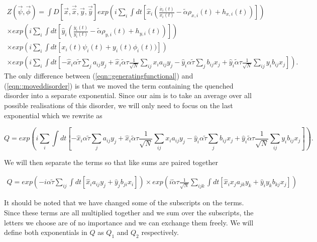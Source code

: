 \documentclass{article}
\begin{document}
	\begin{equation}
	\begin{split}
	\label{eqn::moveddisorder}
		Z(\Vec{\psi}, \Vec{\phi}) = \int D[\Vec{x}, \Vec{\hat{x}}, \Vec{y}, \Vec{\hat{y}}] exp(i
		\sum_i \int dt[\hat{x}_i
		(\frac{\dot{x_i}(t)}{x_i(t)}
			- \tilde{\alpha} \rho_{x, i}(t)+ h_{x, i}(t))]) 
			\\
			\times exp(i \sum_i \int dt[\hat{y}_i
		(\frac{\dot{y_i}(t)}{y_i(t)} 
			- \tilde{\alpha} \rho_{y, i}(t) + h_{y, i}(t))])\\
			\times exp(i \sum_i
		\int dt[x_i(t) \psi_i(t) + y_i(t) \phi_i(t))])\\
		\times exp(i \sum_i \int dt[- \hat{x}_i \alpha \tilde{\tau} \sum_{j} a_
			{ij} 
			y_j +
			\hat{x}_i \tilde{\alpha} \tau \frac{1}{\sqrt{N}} \sum_{i j} x_i a_{ij} y_j - \hat{y}_i
			\alpha 
			\tilde{\tau} \sum_{j} b_
			{ij} 
			x_j +
			\hat{y}_i \tilde{\alpha} \tau \frac{1}{\sqrt{N}} \sum_{i j} y_i b_{ij} x_j]).
	\end{split}
	\end{equation}
	The only difference between (\ref{eqn::generatingfunctional}) and (\ref{eqn::moveddisorder}) is
	that we moved the term containing the quenched disorder into a separate exponential. Since our
	aim is to take an average over all possible realisations of this disorder, we will only need to
	focus on the last exponential which we rewrite as

	\begin{equation}
		Q = exp(i \sum_i \int dt[- \hat{x}_i \alpha \tilde{\tau} \sum_{j} a_
			{ij} 
			y_j +
			\hat{x}_i \tilde{\alpha} \tau \frac{1}{\sqrt{N}} \sum_{i j} x_i a_{ij} y_j - \hat{y}_i
			\alpha 
			\tilde{\tau} \sum_{j} b_
			{ij} 
			x_j +
			\hat{y}_i \tilde{\alpha} \tau \frac{1}{\sqrt{N}} \sum_{i j} y_i b_{ij} x_j]).
	\end{equation}

	We will then separate the terms so that like sums are paired together

	\begin{equation}
	\begin{split}
		Q = exp(-i \alpha \tilde{\tau} \sum_{ij} \int dt[\hat{x}_i a_{ij} y_j + \hat{y}_j b_
			{ji} 
			x_i])
			\times
			exp(i \tilde{\alpha} \tau \frac{1}{\sqrt{N}} \sum_{ijk} \int dt[\hat{x}_i x_j
			a_{jk} y_k + \hat{y}_i y_k b_{kj} x_j])
	\end{split}
	\end{equation}

	It should be noted that we have changed some of the subscripts on the terms. Since these terms
	are all multiplied together and we sum over the subscripts, the letters we choose are of no
	importance and we can exchange them freely. We will define both exponentials in $Q$ as $Q_1$ and
	$Q_2$ respectively.
\end{document}
